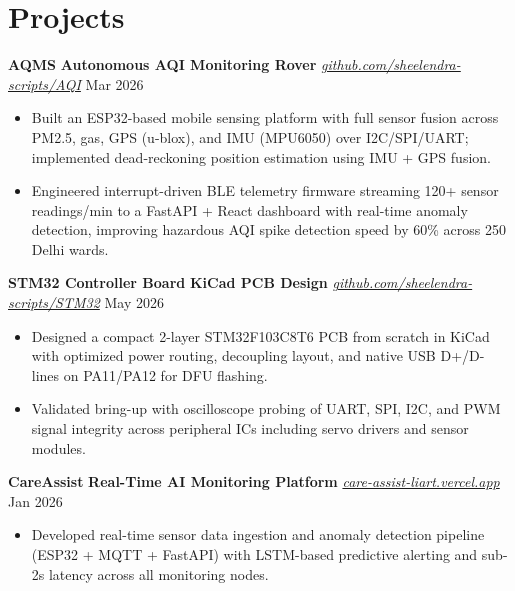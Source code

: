 \documentclass[10pt,letterpaper]{article}
\begin{document}
\section*{Projects}

\textbf{AQMS} \textbar{} \textbf{Autonomous AQI Monitoring Rover} \textbar{} \textit{\href{https://github.com/sheelendra-scripts/AQI}{github.com/sheelendra-scripts/AQI}} \hfill Mar 2026
\begin{itemize}
    \item Built an ESP32-based mobile sensing platform with full sensor fusion across PM2.5, gas, GPS (u-blox), and IMU (MPU6050) over I2C/SPI/UART; implemented dead-reckoning position estimation using IMU + GPS fusion.
    \item Engineered interrupt-driven BLE telemetry firmware streaming 120+ sensor readings/min to a FastAPI + React dashboard with real-time anomaly detection, improving hazardous AQI spike detection speed by 60\% across 250 Delhi wards.
\end{itemize}

\vspace{1pt}

\textbf{STM32 Controller Board} \textbar{} \textbf{KiCad PCB Design} \textbar{} \textit{\href{https://github.com/sheelendra-scripts/STM32}{github.com/sheelendra-scripts/STM32}} \hfill May 2026
\begin{itemize}
    \item Designed a compact 2-layer STM32F103C8T6 PCB from scratch in KiCad with optimized power routing, decoupling layout, and native USB D+/D- lines on PA11/PA12 for DFU flashing.
    \item Validated bring-up with oscilloscope probing of UART, SPI, I2C, and PWM signal integrity across peripheral ICs including servo drivers and sensor modules.
\end{itemize}

\vspace{1pt}

\textbf{CareAssist} \textbar{} \textbf{Real-Time AI Monitoring Platform} \textbar{} \textit{\href{https://care-assist-liart.vercel.app}{care-assist-liart.vercel.app}} \hfill Jan 2026
\begin{itemize}
    \item Developed real-time sensor data ingestion and anomaly detection pipeline (ESP32 + MQTT + FastAPI) with LSTM-based predictive alerting and sub-2s latency across all monitoring nodes.
\end{itemize}
\end{document}
